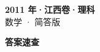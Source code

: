 \documentclass[zihao=-4, a4paper]{ctexart}
\begin{document}
\begin{center}
  {\Large\bfseries 2011 年·江西卷·理科}\\[4pt]
  {\large 数学 · 简答版}
\end{center}
\medskip
{}

\clearpage
{}
\begin{center}{\Large\bfseries 答案速查}\end{center}
\medskip

\end{document}
